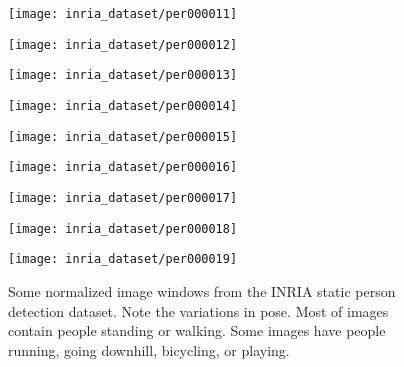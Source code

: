 \begin{figure*}[!htbp]
    \begin{minipage}{2.0\columnwidth}
      \begin{minipage}{0.1\columnwidth} \centerline{\texttt{[image: inria\_dataset/per000011]}}  \end{minipage} \hfill 
      \begin{minipage}{0.1\columnwidth} \centerline{\texttt{[image: inria\_dataset/per000012]}}  \end{minipage} \hfill 
      \begin{minipage}{0.1\columnwidth} \centerline{\texttt{[image: inria\_dataset/per000013]}}  \end{minipage} \hfill 
      \begin{minipage}{0.1\columnwidth} \centerline{\texttt{[image: inria\_dataset/per000014]}}  \end{minipage} \hfill 
      \begin{minipage}{0.1\columnwidth} \centerline{\texttt{[image: inria\_dataset/per000015]}}  \end{minipage} \hfill 
      \begin{minipage}{0.1\columnwidth} \centerline{\texttt{[image: inria\_dataset/per000016]}}  \end{minipage} \hfill 
      \begin{minipage}{0.1\columnwidth} \centerline{\texttt{[image: inria\_dataset/per000017]}}  \end{minipage} \hfill 
      \begin{minipage}{0.1\columnwidth} \centerline{\texttt{[image: inria\_dataset/per000018]}}  \end{minipage} \hfill 
      \begin{minipage}{0.1\columnwidth} \centerline{\texttt{[image: inria\_dataset/per000019]}}  \end{minipage} \hfill
    \end{minipage}
    
  \vspace{-1ex}
  \caption
    {
    \small
	Some normalized image windows from the INRIA static person detection
	dataset. Note the variations in pose. Most of images contain people standing or
	walking. Some images have people running, going downhill, bicycling, or playing.
    }
  \label{fig:inria_dataset_example}
\end{figure*}


